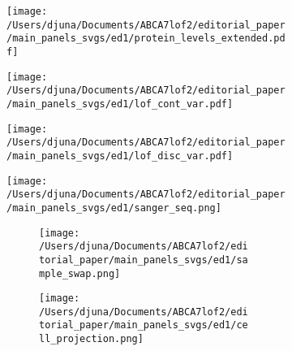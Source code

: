 \documentclass[12pt]{article}
\begin{document}
\begin{figure}[H]
    \begin{subfigure}[t]{0.8\textwidth}
        \caption{}
        \texttt{[image: /Users/djuna/Documents/ABCA7lof2/editorial\_paper/main\_panels\_svgs/ed1/protein\_levels\_extended.pdf]}        
    \end{subfigure}  
    \par
    \begin{subfigure}[t]{0.8\textwidth}
        \caption{}
        \texttt{[image: /Users/djuna/Documents/ABCA7lof2/editorial\_paper/main\_panels\_svgs/ed1/lof\_cont\_var.pdf]}        
    \end{subfigure}  
    \par
    \begin{subfigure}[t]{\textwidth}
        \caption{}
        \texttt{[image: /Users/djuna/Documents/ABCA7lof2/editorial\_paper/main\_panels\_svgs/ed1/lof\_disc\_var.pdf]}        
    \end{subfigure}  
    \begin{subfigure}[t]{.5\textwidth}
        \caption{}
        \texttt{[image: /Users/djuna/Documents/ABCA7lof2/editorial\_paper/main\_panels\_svgs/ed1/sanger\_seq.png]}        
    \end{subfigure}  
    \begin{subfigure}[t]{0.5\textwidth}
        \begin{subfigure}[t]{\textwidth}
            \caption{}
            \texttt{[image: /Users/djuna/Documents/ABCA7lof2/editorial\_paper/main\_panels\_svgs/ed1/sample\_swap.png]}     
        \end{subfigure}    
        \begin{subfigure}[t]{\textwidth}
            \caption{}
            \texttt{[image: /Users/djuna/Documents/ABCA7lof2/editorial\_paper/main\_panels\_svgs/ed1/cell\_projection.png]}     
        \end{subfigure}    
    \end{subfigure}  
\end{figure}
\end{document}

